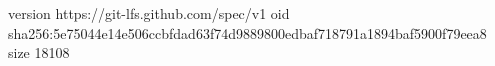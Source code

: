 version https://git-lfs.github.com/spec/v1
oid sha256:5e75044e14e506ccbfdad63f74d9889800edbaf718791a1894baf5900f79eea8
size 18108

